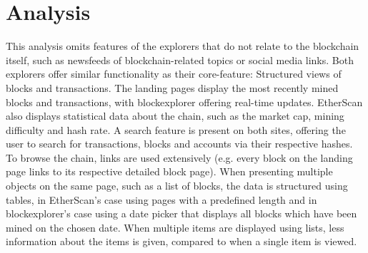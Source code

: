 \section{Analysis} \label{analysis}
This analysis omits features of the explorers that do not relate to the blockchain itself, such as newsfeeds of blockchain-related topics or social media links. Both explorers offer similar functionality as their core-feature: Structured views of blocks and transactions. The landing pages display the most recently mined blocks and transactions, with blockexplorer offering real-time updates. EtherScan also displays statistical data about the chain, such as the market cap, mining difficulty and hash rate. A search feature is present on both sites, offering the user to search for transactions, blocks and accounts via their respective hashes. To browse the chain, links are used extensively (e.g. every block on the landing page links to its respective detailed block page). When presenting multiple objects on the same page, such as a list of blocks, the data is structured using tables, in EtherScan's case using pages with a predefined length and in blockexplorer's case using a date picker that displays all blocks which have been mined on the chosen date. When multiple items are displayed using lists, less information about the items is given, compared to when a single item is viewed.
